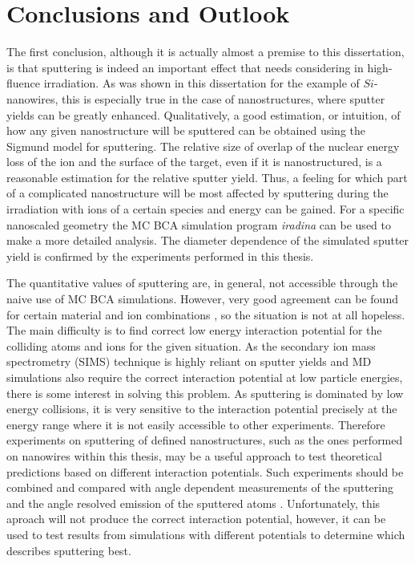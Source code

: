 \chapter{Conclusions and Outlook}

The first conclusion, although it is actually almost a premise to this dissertation, is that sputtering is indeed an important effect that needs considering in high-fluence irradiation. As was shown in this dissertation for the example of $Si$-nanowires, this is especially true in the case of nanostructures, where sputter yields can be greatly enhanced. Qualitatively, a good estimation, or intuition, of how any given nanostructure will be sputtered can be obtained using the Sigmund model for sputtering. The relative size of overlap of the nuclear energy loss of the ion and the surface of the target, even if it is nanostructured, is a reasonable estimation for the relative sputter yield. Thus, a feeling for which part of a complicated nanostructure will be most affected by sputtering during the irradiation with ions of a certain species and energy can be gained. For a specific nanoscaled geometry the MC BCA simulation program \emph{iradina} \cite{borschel_ion_2011} can be used to make a more detailed analysis. The diameter dependence of the simulated sputter yield is confirmed by the experiments performed in this thesis.

The quantitative values of sputtering are, in general, not accessible through the naive use of MC BCA simulations. However, very good agreement can be found for certain material and ion combinations \cite{biersack_computer_1987,hofsass_simulation_2014}, so the situation is not at all hopeless. The main difficulty is to find correct low energy interaction potential for the colliding atoms and ions for the given situation. As the secondary ion mass spectrometry (SIMS) technique is highly reliant on sputter yields and MD simulations also require the correct interaction potential at low particle energies, there is some interest in solving this problem.  As sputtering is dominated by low energy collisions, it is very sensitive to the interaction potential precisely at the energy range where it is not easily accessible to other experiments. Therefore experiments on sputtering of defined nanostructures, such as the ones performed on nanowires within this thesis, may be a useful approach to test theoretical predictions based on different interaction potentials. Such experiments should be combined and compared with angle dependent measurements of the sputtering \cite{hofsass_simulation_2014} and the angle resolved emission of the sputtered atoms \cite{wirtz_storing_2008,verdeil_angular_2008}. Unfortunately, this aproach will not produce the correct interaction potential, however, it can be used to test results from simulations with different potentials to determine which describes sputtering best.

